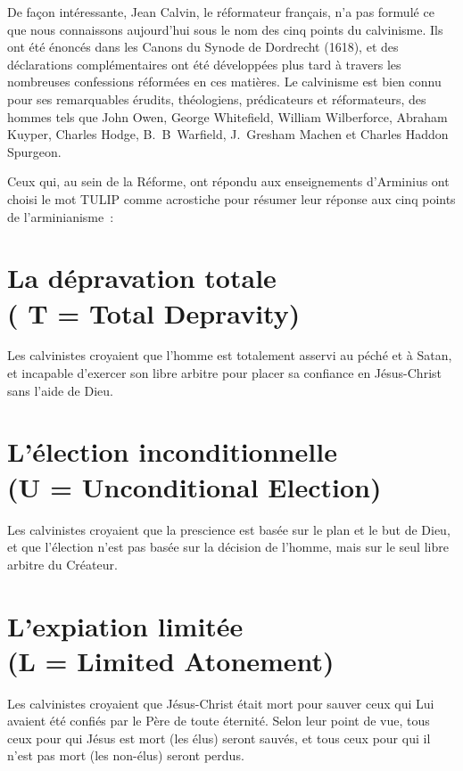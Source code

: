 
\digestpagebreak
\begin{digestpar}{}
De façon intéressante, Jean Calvin, le réformateur français, n'a pas formulé
 ce que nous con\-naissons au\-jour\-d'hui sous le nom des cinq points du calvinisme.
 Ils ont été énoncés dans les Canons du Synode de Dordrecht (1618), et des déclarations
 complémentaires ont été développées plus tard à travers les nombreuses
 confessions réformées en ces matières. Le calvinisme est bien connu
 pour 
 ses remarquables érudits, théologiens, prédicateurs et réformateurs,
 des hommes tels que John Owen, George Whitefield,
 William Wilberforce, Abraham Kuyper, Charles Hodge,
 B.~B~Warfield, J.~Gresham Machen et
 Charles Haddon Spurgeon.
\end{digestpar}

Ceux qui, au sein de la Réforme, ont répondu aux enseignements d'Arminius
 ont choisi le mot \og \mbox{TULIP} \fg{} comme acrostiche pour résumer
 leur réponse aux cinq points de l'arminianisme~:

\nobreak

\newcommand*{\sectitle}[1]{%
   \normalsize(#1)}
\newcommand*{\secwithtitle}[2]{%
   \section*{#1\\\sectitle{#2}}}

\secwithtitle{La dépravation totale}{ T = Total Depravity}

Les calvinistes croyaient que l'hom\-me est totalement 
 asservi au péché  et à Satan,
 et incapable d'exercer son libre arbitre 
 pour placer sa confiance en Jésus-Christ sans l'aide de Dieu.

\secwithtitle{L'élection inconditionnelle}{U = Unconditional Election}

Les calvinistes croyaient que la prescience
 est basée sur le plan et le but de Dieu, et que l'élection
 n'est pas basée sur la décision de l'hom\-me, mais sur le seul \og libre arbitre \fg{}
 du Créateur.

\secwithtitle{L'expiation limitée}{L = Limited Atonement}

Les calvinistes croyaient que Jésus-Christ était mort pour sauver
 ceux qui Lui avaient été confiés par le Père de toute éternité.
 Selon leur point de vue, tous ceux pour qui Jésus est mort (les élus) seront sauvés,
 et tous ceux pour qui il n'est pas mort (les non-élus) seront perdus.

